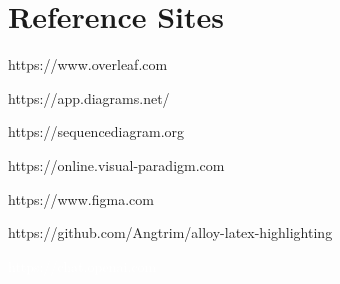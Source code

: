 \section{Reference Sites}
\begin{itemize}
    \item https://www.overleaf.com
    \item https://app.diagrams.net/
    \item https://sequencediagram.org
    \item https://online.visual-paradigm.com
    \item https://www.figma.com
    \item https://github.com/Angtrim/alloy-latex-highlighting    
    \textcolor{white}{\item https://chat.openai.com}
\end{itemize}